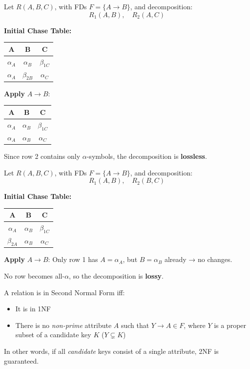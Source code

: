\documentclass{article}
\begin{document}

Let \( R(A, B, C) \), with FDs \( F = \{ A \to B \} \), and decomposition:
\[
R_1(A, B), \quad R_2(A, C)
\]

\textbf{Initial Chase Table:}

\begin{tabular}{ccc}
\toprule
A & B & C \\
\midrule
\( \alpha_A \) & \( \alpha_B \) & \( \beta_{1C} \) \\
\( \alpha_A \) & \( \beta_{2B} \) & \( \alpha_C \) \\
\bottomrule
\end{tabular}

\textbf{Apply } \( A \to B \):  
\begin{tabular}{ccc}
\toprule
A & B & C \\
\midrule
\( \alpha_A \) & \( \alpha_B \) & \( \beta_{1C} \) \\
\( \alpha_A \) & \( \alpha_B \) & \( \alpha_C \) \\
\bottomrule
\end{tabular}

Since row 2 contains only \(\alpha\)-symbols, the decomposition is \textbf{lossless}.


Let \( R(A, B, C) \), with FDs \( F = \{ A \to B \} \), and decomposition:
\[
R_1(A, B), \quad R_2(B, C)
\]

\textbf{Initial Chase Table:}

\begin{tabular}{ccc}
\toprule
A & B & C \\
\midrule
\( \alpha_A \) & \( \alpha_B \) & \( \beta_{1C} \) \\
\( \beta_{2A} \) & \( \alpha_B \) & \( \alpha_C \) \\
\bottomrule
\end{tabular}

\textbf{Apply } \( A \to B \):  
Only row 1 has \( A = \alpha_A \), but \( B = \alpha_B \) already → no changes.

No row becomes all-\(\alpha\), so the decomposition is \textbf{lossy}.


A relation is in Second Normal Form iff:
\begin{itemize}
    \item It is in 1NF
    \item There is no \textit{non-prime} attribute $A$ such that $Y \to A \in F$, where $Y$ is a proper subset of a candidate key $K$ ($Y \subsetneq K$)
\end{itemize}
In other words, if all \textit{candidate} keys consist of a single attribute, 2NF is guaranteed.
\end{document}
